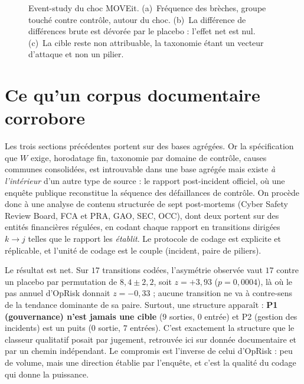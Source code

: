 \begin{figure}[htbp]
\centering
{}
\caption{Event-study du choc MOVEit. (a)~Fréquence des brèches, groupe touché contre
contrôle, autour du choc. (b)~La différence de différences brute est dévorée par le
placebo : l'effet net est nul. (c)~La cible reste non attribuable, la taxonomie étant un
vecteur d'attaque et non un pilier.}
\label{fig:moveit}
\end{figure}


\section{Ce qu'un corpus documentaire corrobore}
\label{sec:postmortems}

Les trois sections précédentes portent sur des bases agrégées. Or la spécification que
$W$ exige, horodatage fin, taxonomie par domaine de contrôle, causes communes consolidées, est
introuvable dans une base agrégée mais existe \emph{à l'intérieur} d'un autre type de source :
le rapport post-incident officiel, où une enquête publique reconstitue la séquence des
défaillances de contrôle. On procède donc à une analyse de contenu structurée de sept
post-mortems (Cyber Safety Review Board, FCA et PRA, GAO, SEC, OCC), dont deux portent sur des
entités financières régulées, en codant chaque rapport en transitions dirigées $k \to j$ telles
que le rapport les \emph{établit}. Le protocole de codage est explicite et réplicable, et
l'unité de codage est le couple (incident, paire de piliers).

Le résultat est net. Sur $17$ transitions codées, l'asymétrie observée vaut $17$ contre un
placebo par permutation de $8{,}4 \pm 2{,}2$, soit $z=+3{,}93$ ($p=0{,}0004$), là où le pas
annuel d'OpRisk donnait $z=-0{,}33$ ; aucune transition ne va à contre-sens de la
tendance dominante de sa paire. Surtout, une structure apparaît :
\textbf{P1 (gouvernance) n'est jamais une cible} ($9$ sorties, $0$ entrée) et P2
(gestion des incidents) est un puits ($0$ sortie, $7$ entrées). C'est exactement la structure
que le classeur qualitatif posait par jugement, retrouvée ici sur donnée documentaire et par un
chemin indépendant. Le compromis est l'inverse de celui d'OpRisk : peu de volume, mais une
direction établie par l'enquête, et c'est la qualité du codage qui donne la puissance.

